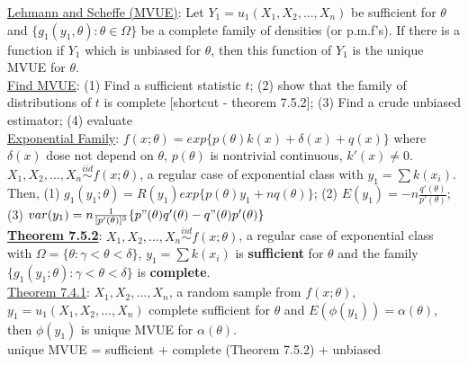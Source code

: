 \documentclass[10pt,landscape]{article}
\begin{document}
\begin{multicols}{3}
\begin{description}
		\underline{Lehmann and Scheffe (MVUE)}: Let $Y_1 = u_1(X_1,X_2, ..., X_n)$ be sufficient for $\theta$ and $\{g_1(y_1, \theta): \theta	\in \Omega \}$ be a complete family of densities (or p.m.f's). If there is a function if $Y_1$ which is unbiased for $\theta	$, then this function of $Y_1$ is the unique MVUE for $\theta$. \\
		\underline{Find MVUE}: (1) Find a sufficient statistic $t$; (2) show that the family of distributions of $t$ is complete [shortcut - theorem 7.5.2]; (3) Find a crude unbiased estimator; (4) evaluate \\
		\underline{Exponential Family}: $f(x; \theta) = exp\{p(\theta)k(x) + \delta (x) + q(x)\}$ where $\delta(x)$ dose not depend on $\theta$, $p(\theta)$ is nontrivial continuous, $k'(x) \neq 0$.\\
		$X_1,X_2, ..., X_n \overset{iid}{\sim} f(x; \theta)$, a regular case of exponential class with $y_1 = \sum k(x_i)$. Then, (1) $g_1(y_1; \theta) = R(y_1)exp\{p(\theta)y_1 + nq(\theta)\}$; (2) $E(y_1) = -n\frac{q'(\theta)}{p'(\theta)}$; (3) $var(y_1) = n\frac{1}{[p'(\theta)]^3}\{p"(\theta)q'(\theta) - q"(\theta)p'(\theta)\}$ \\
		\underline{\textbf{Theorem 7.5.2}}: $X_1,X_2, ..., X_n \overset{iid}{\sim} f(x; \theta)$, a regular case of exponential class with $\Omega = \{\theta: \gamma < \theta < \delta \}$, $y_1 = \sum	k(x_i)$ is \textbf{sufficient} for $\theta$ and the family $\{g_1(y_1; \theta): \gamma < \theta< \delta \}$ is \textbf{complete}. \\
		\underline{Theorem 7.4.1}: $X_1, X_2, ..., X_n$, a random sample from $f(x;\theta)$, $y_1 = u_1(X_1, X_2, ..., X_n)$ complete sufficient for $\theta$ and  $E(\phi(y_1)) = \alpha(\theta)$, then $\phi(y_1)$ is unique MVUE for $\alpha(\theta)$.\\
		unique MVUE = sufficient + complete (Theorem 7.5.2) + unbiased \\
		 
	\end{description}	  
	

\end{multicols}
\end{document}
